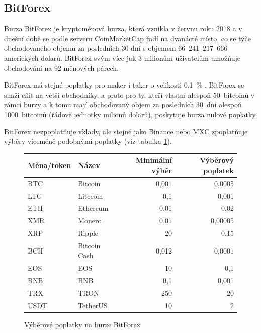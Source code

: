 \documentclass[thesis=B,czech]{FITthesis}[2019/03/21]
\begin{document}
\subsection{BitForex}
Burza BitForex je kryptoměnová burza, která vznikla v červnu roku 2018 a v dnešní době se podle serveru CoinMarketCap řadí na dvanácté místo, co se týče obchodovaného objemu za posledních 30 dní s objemem 66~241~217~666 amerických dolarů. \cite{coinmarketcap} BitForex svým více jak 3 milionům uživatelům umožňuje obchodování na 92 měnových párech.  \cite{cryptowisser_bitforex}

BitForex má stejné poplatky pro maker i taker o velikosti 0,1~\% . BitForex se snaží cílit na větší obchodníky, a proto pro ty, kteří vlastní alespoň 50~bitcoinů v rámci burzy a k tomu mají obchodovaný objem za posledních 30~dní alespoň 1000~bitcoinů (řádově jednotky milionů dolarů), poskytuje burza nulové poplatky. 

BitForex nezpoplatňuje vklady, ale stejně jako Binance nebo MXC zpoplatňuje výběry víceméně podobnými poplatky (viz tabulka \ref{bitforex_fees}). \cite{cryptowisser_bitforex}

\begin{figure}\centering
    \begin{center}
     \begin{tabular}{||l | l | r | r||} 
     \hline
     Měna/token & Název & Minimální výběr & Výběrový poplatek \\ [0.5ex] 
     \hline\hline
     BTC & Bitcoin & 0,001 & 0,0005 \\ 
     \hline
     LTC & Litecoin & 0,1 & 0,001 \\
     \hline
     ETH & Ethereum & 0,01 & 0,02 \\
     \hline
     XMR & Monero & 0,01 & 0,00005 \\
     \hline
     XRP & Ripple & 20 & 0,15 \\
     \hline
     BCH & Bitcoin Cash & 0,012 & 0,0001 \\
     \hline
     EOS & EOS & 10 & 0,1 \\
     \hline
     BNB & BNB & 0,1 & 0,001 \\
     \hline
     TRX & TRON & 250 & 20 \\
     \hline
     USDT & TetherUS & 10 & 2 \\ [1ex] 
     \hline
    \end{tabular}
    \end{center}
    \caption{Výběrové poplatky na burze BitForex \cite{bitforex_fees}}
    \label{bitforex_fees}
\end{figure}
\end{document}
